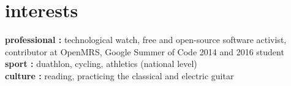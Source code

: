 \documentclass[]{cv-style}          %
\begin{document}
\section{interests}
  \vspace{-0.2cm}

\textbf{professional :} technological watch,  free and open-source software activist, contributor at OpenMRS, Google Summer of Code 2014 and 2016 student\\
\textbf{sport :} duathlon, cycling, athletics (national level) \\
\textbf{culture :} reading, practicing the classical and electric guitar
\end{document}
